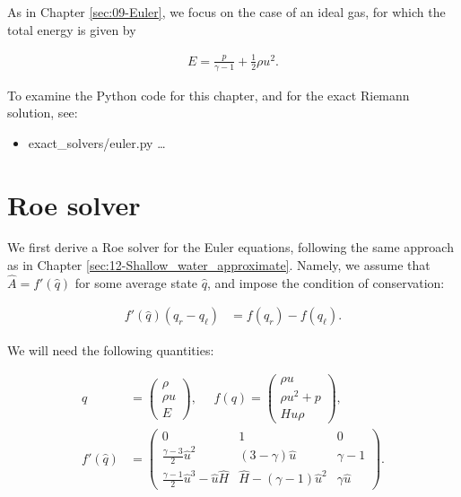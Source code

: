 \documentclass{SIAMbook2016}
\providecommand{\tightlist}{%
      \setlength{\itemsep}{0pt}\setlength{\parskip}{0pt}}
\begin{document}
As in Chapter \ref{sec:09-Euler}, we focus on the case of an ideal gas,
for which the total energy is given by

\begin{align} \label{EA:EOS}
    E = \frac{p}{\gamma-1} + \frac{1}{2}\rho u^2.
\end{align}

To examine the Python code for this chapter, and for the exact Riemann
solution, see:

\begin{itemize}
\tightlist
\item
  {exact\_solvers/euler.py} \ldots{}
\end{itemize}

\hypertarget{roe-solver}{%
\section{Roe solver}\label{roe-solver}}

We first derive a Roe solver for the Euler equations, following the same
approach as in Chapter \ref{sec:12-Shallow_water_approximate}. Namely,
we assume that \(\hat{A} = f'(\hat{q})\) for some average state
\(\hat{q}\), and impose the condition of conservation:

\begin{align} \label{EA:cons}
    f'(\hat{q}) (q_r - q_\ell) & = f(q_r) - f(q_\ell).
\end{align}

We will need the following quantities:

\begin{align}
q & = \begin{pmatrix} \rho \\ \rho u \\ E \end{pmatrix}, \ \ \ \ \ \  f(q) = \begin{pmatrix} \rho u \\ \rho u^2 + p \\ H u \rho \end{pmatrix}, \\
f'(\hat{q}) & = \begin{pmatrix} 
                0 & 1 & 0 \\ 
                \frac{\gamma-3}{2}\hat{u}^2 & (3-\gamma)\hat{u} & \gamma-1 \\
                \frac{\gamma-1}{2}\hat{u}^3 - \hat{u}\hat{H} & \hat{H} - (\gamma-1)\hat{u}^2 & \gamma \hat{u} \end{pmatrix}.
\end{align}
\end{document}
